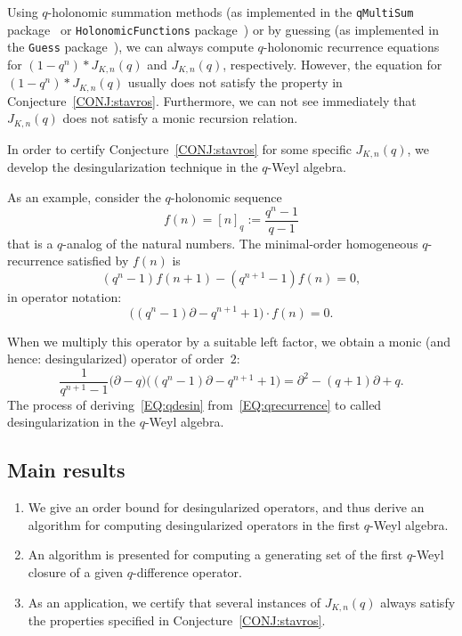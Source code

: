 \documentclass[10pt,a4paper]{article}
\newcommand{\pa}{ {\partial}}
\begin{document}
Using $q$-holonomic summation methods (as implemented in the \texttt{qMultiSum}
package~\cite{Riese03} or \texttt{HolonomicFunctions}
package~\cite{Christoph2010}) or by guessing (as implemented in the
\texttt{Guess} package~\cite{Kauers2009a}), 
we can always compute $q$-holonomic recurrence equations for $(1-q^n)*J_{K,n}(q)$ and $J_{K,n}(q)$, respectively. 
However, the equation for $(1-q^n)*J_{K,n}(q)$ usually does not satisfy the property in Conjecture~\ref{CONJ:stavros}. 
Furthermore, we can not see immediately that $J_{K,n}(q)$ does not satisfy a monic recursion relation.

In order to certify Conjecture~\ref{CONJ:stavros} for some specific $J_{K,n}(q)$, 
we develop the desingularization technique in the $q$-Weyl algebra. 

As an example, consider the $q$-holonomic sequence
\[
  f(n) = [n]_q := \frac{q^n-1}{q-1}
\]
that is a $q$-analog of the natural numbers.  The minimal-order homogeneous
$q$-recurrence satisfied by $f(n)$ is
\[
  (q^n-1)f(n+1) - (q^{n+1}-1)f(n) = 0,
\]
in operator notation:
\begin{equation} \label{EQ:qrecurrence}
 \bigl((q^n-1)\pa - q^{n+1} + 1\bigr) \cdot f(n) = 0.
\end{equation}

When we multiply this operator by a suitable left factor, we obtain
a monic (and hence: desingularized) operator of order~$2$:
\begin{equation} \label{EQ:qdesin}
  \frac{1}{q^{n+1}-1}\bigl(\pa - q\bigr)\bigl((q^n-1)\pa - q^{n+1} + 1\bigr) =
  \pa^2 - (q+1)\pa + q.
\end{equation}
The process of deriving~\eqref{EQ:qdesin} from~\eqref{EQ:qrecurrence} to called desingularization in the $q$-Weyl algebra.


\subsection{Main results}

\begin{enumerate}
 \item We give an order bound for desingularized operators, and thus derive
an algorithm for computing desingularized operators in the first $q$-Weyl
algebra.
 \item An algorithm is presented for computing a generating set
of the first $q$-Weyl closure of a given $q$-difference operator.
 \item As an application, we certify that several instances of $J_{K,n}(q)$ always 
 satisfy the properties specified in Conjecture~\ref{CONJ:stavros}.  
\end{enumerate}
\end{document}
